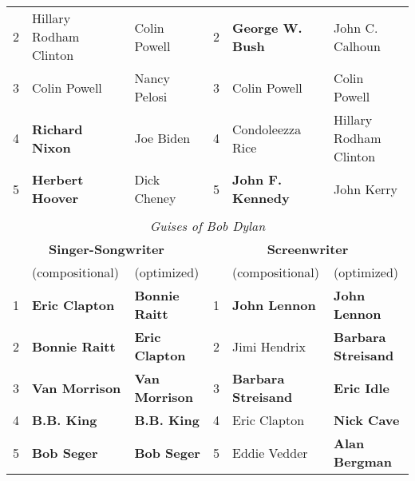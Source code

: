 \documentclass[a4paper,10pt]{article}
\begin{document}
\begin{table*}
\begin{tabular}{lll | lll}
 {\scriptsize 2 } & { \scriptsize Hillary Rodham Clinton } & { \scriptsize Colin Powell}&  {\scriptsize 2 } & { \scriptsize \textbf{George W. Bush} } & { \scriptsize John C. Calhoun}\\ 
 {\scriptsize 3 } & { \scriptsize Colin Powell } & { \scriptsize Nancy Pelosi} &  {\scriptsize 3 } & { \scriptsize Colin Powell } & { \scriptsize Colin Powell }\\ 
 {\scriptsize 4 } & { \scriptsize \textbf{Richard Nixon} } & { \scriptsize Joe Biden} &  {\scriptsize 4 } & { \scriptsize Condoleezza Rice } & { \scriptsize Hillary Rodham Clinton}\\ 
 {\scriptsize 5 } & { \scriptsize \textbf{Herbert Hoover} } & { \scriptsize Dick Cheney } &  {\scriptsize 5 } & { \scriptsize \textbf{John F. Kennedy} } & { \scriptsize John Kerry }\\ \hline  
 \\
\multicolumn{6}{c}{ \emph{Guises of Bob Dylan } } \\ \hline \hline
 \multicolumn{3}{c}{\small \textbf{Singer-Songwriter}} & \multicolumn{3}{c}{\small \textbf{Screenwriter}}  \\  \hline
 \multicolumn{1}{l}{\small } & \multicolumn{1}{l}{\small \textbf{} (compositional)} & \multicolumn{1}{l|}{\small \textbf{} (optimized)} & \multicolumn{1}{l}{\small } & \multicolumn{1}{l}{\small \textbf{} (compositional)} & \multicolumn{1}{l}{\small \textbf{} (optimized)}\\ \hline 
  {\scriptsize 1 } & { \scriptsize \textbf{Eric Clapton} } & { \scriptsize \textbf{Bonnie Raitt}} &  {\scriptsize 1 } & { \scriptsize \textbf{John Lennon} } & { \scriptsize \textbf{John Lennon}} \\ 
 {\scriptsize 2 } & { \scriptsize \textbf{Bonnie Raitt} } & { \scriptsize \textbf{Eric Clapton}} &  {\scriptsize 2 } & { \scriptsize Jimi Hendrix } & { \scriptsize \textbf{Barbara Streisand}}\\ 
 {\scriptsize 3 } & { \scriptsize \textbf{Van Morrison} } & { \scriptsize \textbf{Van Morrison}} &  {\scriptsize 3 } & { \scriptsize \textbf{Barbara Streisand} } & { \scriptsize \textbf{Eric Idle}}\\ 
 {\scriptsize 4 } & { \scriptsize \textbf{B.B. King} } & { \scriptsize \textbf{B.B. King} } &  {\scriptsize 4 } & { \scriptsize Eric Clapton } & { \scriptsize \textbf{Nick Cave}}\\ 
 {\scriptsize 5 } & { \scriptsize \textbf{Bob Seger}  } & { \scriptsize \textbf{Bob Seger}} &  {\scriptsize 5 } & { \scriptsize Eddie Vedder } & { \scriptsize \textbf{Alan Bergman}}\\ \hline

\end{tabular}
\end{table*}
\end{document}
